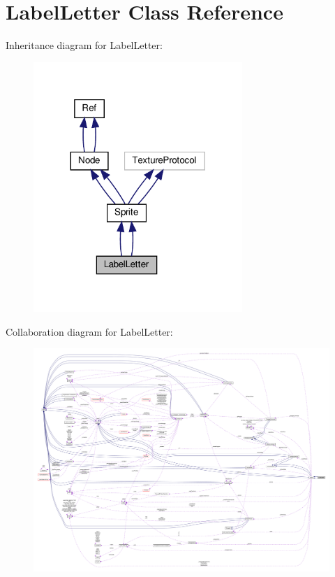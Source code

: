 \hypertarget{classLabelLetter}{}\section{Label\+Letter Class Reference}
\label{classLabelLetter}


Inheritance diagram for Label\+Letter\+:
\nopagebreak
\begin{figure}[H]
\begin{center}
\leavevmode
\includegraphics[width=224pt]{classLabelLetter__inherit__graph}
\end{center}
\end{figure}


Collaboration diagram for Label\+Letter\+:
\nopagebreak
\begin{figure}[H]
\begin{center}
\leavevmode
\includegraphics[width=350pt]{classLabelLetter__coll__graph}
\end{center}
\end{figure}
